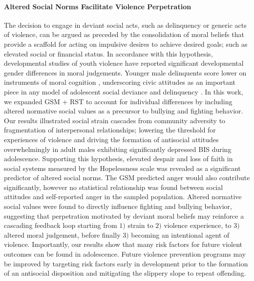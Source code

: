 \documentclass[utf8]{article}
\begin{document}
\paragraph{Altered Social Norms Facilitate Violence Perpetration}
The decision to engage in deviant social acts, such as delinquency or generic acts of violence, can be argued as preceded by the consolidation of moral beliefs that provide a scaffold for acting on impulsive desires to achieve desired goals; such as elevated social or financial status. In accordance with this hypothesis, developmental studies of youth violence have reported significant developmental gender differences in moral judgements. Younger male delinquents score lower on instruments of moral cognition \citep{tarry2007attitudes}, underscoring civic attitudes as an important piece in any model of adolescent social deviance and delinquency \citep{stams2006moral}. In this work, we expanded GSM + RST to account for individual differences by including altered normative social values as a precursor to bullying and fighting behavior. Our results illustrated social strain cascades from community adversity to fragmentation of interpersonal relationships; lowering the threshold for experiences of violence and driving the formation of antisocial attitudes overwhelmingly in adult males exhibiting significantly depressed BIS during adolescence. Supporting this hypothesis, elevated despair and loss of faith in social systems measured by the Hopelessness scale was revealed as a significant predictor of altered social norms. The GSM predicted anger would also contribute significantly, however no statistical relationship was found between social attitudes and self-reported anger in the sampled population. Altered normative social values were found to directly influence fighting and bullying behavior, suggesting that perpetration motivated by deviant moral beliefs may reinforce a cascading feedback loop starting from $1)$ strain to $2)$ violence experience, to  $3)$ altered moral judgement, before finally $3)$ becoming an intentional agent of violence. Importantly, our results show that many risk factors for future violent outcomes can be found in adolescence. Future violence prevention programs may be improved by targeting risk factors early in development prior to the formation of an antisocial disposition and mitigating the slippery slope to repeat offending.
\end{document}
